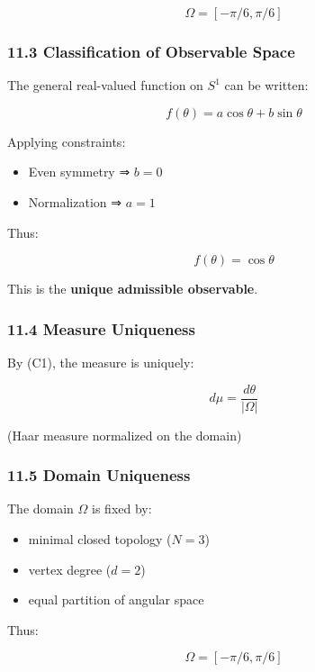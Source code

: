 \documentclass[
]{article}
\providecommand{\tightlist}{%
  \setlength{\itemsep}{0pt}\setlength{\parskip}{0pt}}
\begin{document}
\[
\Omega = [-\pi/6, \pi/6]
\]

\hypertarget{classification-of-observable-space}{%
\subsubsection{11.3 Classification of Observable
Space}\label{classification-of-observable-space}}

The general real-valued function on \(S^1\) can be written:

\[
f(\theta) = a \cos\theta + b \sin\theta
\]

Applying constraints:

\begin{itemize}
\tightlist
\item
  Even symmetry ⇒ \(b = 0\)
\item
  Normalization ⇒ \(a = 1\)
\end{itemize}

Thus:

\[
f(\theta) = \cos\theta
\]

This is the \textbf{unique admissible observable}.

\hypertarget{measure-uniqueness}{%
\subsubsection{11.4 Measure Uniqueness}\label{measure-uniqueness}}

By (C1), the measure is uniquely:

\[
d\mu = \frac{d\theta}{|\Omega|}
\]

(Haar measure normalized on the domain)

\hypertarget{domain-uniqueness}{%
\subsubsection{11.5 Domain Uniqueness}\label{domain-uniqueness}}

The domain \(\Omega\) is fixed by:

\begin{itemize}
\tightlist
\item
  minimal closed topology (\(N = 3\))
\item
  vertex degree (\(d = 2\))
\item
  equal partition of angular space
\end{itemize}

Thus:

\[
\Omega = [-\pi/6, \pi/6]
\]
\end{document}
